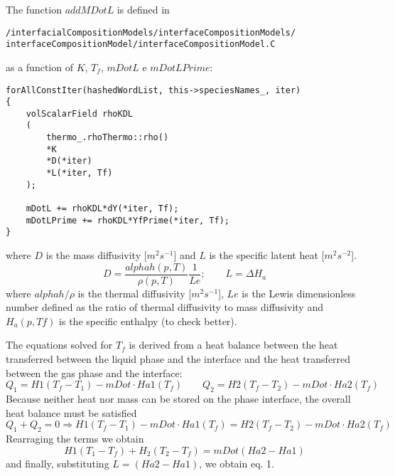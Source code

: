 \documentclass[]{report}
\begin{document}
The function $addMDotL$ is defined in 
\begin{verbatim}
/interfacialCompositionModels/interfaceCompositionModels/
interfaceCompositionModel/interfaceCompositionModel.C
\end{verbatim}
as a function of $K$, $T_f$, $mDotL$ e $mDotLPrime$:
\begin{verbatim}
forAllConstIter(hashedWordList, this->speciesNames_, iter)
{
    volScalarField rhoKDL
    (
		thermo_.rhoThermo::rho()
		*K
		*D(*iter)
		*L(*iter, Tf)
	);

	mDotL += rhoKDL*dY(*iter, Tf);
	mDotLPrime += rhoKDL*YfPrime(*iter, Tf);
}
\end{verbatim}
where $D$ is the mass diffusivity [$m^2 s^{-1}$] and $L$ is the specific latent heat [$m^2 s^{-2}$].
\begin{equation}
D=\frac{alphah(p,T)}{\rho(p,T)}\frac{1}{Le}; \qquad  L=\Delta H_a
\end{equation}
where $alphah/\rho$ is the thermal diffusivity [$m^{2}s^{-1}$], $Le$ is the Lewis dimensionless number defined as the ratio of thermal diffusivity to mass diffusivity and $H_a(p,Tf)$ is the specific enthalpy (to check better).

The equations solved for $T_f$ is derived from a heat balance between the heat transferred between the liquid phase and the interface and the heat transferred between the gas phase and the interface:
\begin{equation}
Q_1 = H1(T_f-T_1)-mDot\cdot Ha1(T_f)\qquad Q_2 = H2(T_f-T_2)-mDot\cdot Ha2(T_f)
\end{equation}
Because neither heat nor mass can be stored on the phase interface, the overall heat balance must be satisfied
\begin{equation}
Q_1+Q_2=0 \Rightarrow  H1(T_f-T_1)-mDot\cdot Ha1(T_f) =  H2(T_f-T_2)-mDot\cdot Ha2(T_f)
\end{equation}
Rearraging the terms we obtain 
\begin{equation}
H1(T_1-T_f)+H_2(T_2-T_f)=mDot(Ha2-Ha1)
\end{equation}
and finally, substituting $L=(Ha2-Ha1)$, we obtain eq. 1.
\end{document}
